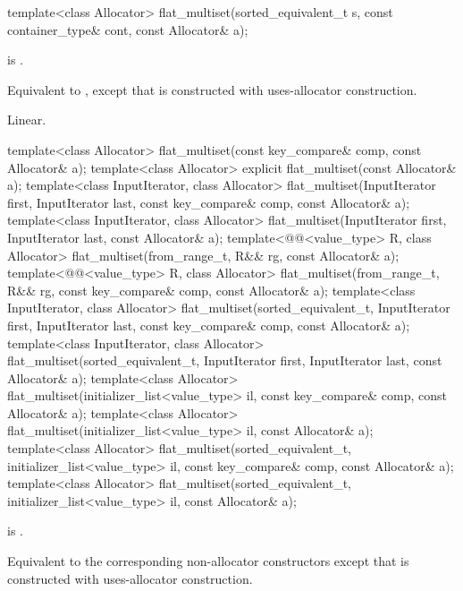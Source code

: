 %
\begin{itemdecl}
template<class Allocator>
  flat_multiset(sorted_equivalent_t s, const container_type& cont, const Allocator& a);
\end{itemdecl}

\begin{itemdescr}
\pnum
\constraints
{} is .

\pnum
\effects
Equivalent to ,
except that  is constructed with
uses-allocator construction.

\pnum
\complexity
Linear.
\end{itemdescr}

%
\begin{itemdecl}
template<class Allocator>
  flat_multiset(const key_compare& comp, const Allocator& a);
template<class Allocator>
  explicit flat_multiset(const Allocator& a);
template<class InputIterator, class Allocator>
  flat_multiset(InputIterator first, InputIterator last,
                const key_compare& comp, const Allocator& a);
template<class InputIterator, class Allocator>
  flat_multiset(InputIterator first, InputIterator last, const Allocator& a);
template<@@<value_type> R, class Allocator>
  flat_multiset(from_range_t, R&& rg, const Allocator& a);
template<@@<value_type> R, class Allocator>
  flat_multiset(from_range_t, R&& rg, const key_compare& comp, const Allocator& a);
template<class InputIterator, class Allocator>
  flat_multiset(sorted_equivalent_t, InputIterator first, InputIterator last,
                const key_compare& comp, const Allocator& a);
template<class InputIterator, class Allocator>
  flat_multiset(sorted_equivalent_t, InputIterator first, InputIterator last, const Allocator& a);
template<class Allocator>
  flat_multiset(initializer_list<value_type> il, const key_compare& comp, const Allocator& a);
template<class Allocator>
  flat_multiset(initializer_list<value_type> il, const Allocator& a);
template<class Allocator>
  flat_multiset(sorted_equivalent_t, initializer_list<value_type> il,
                const key_compare& comp, const Allocator& a);
template<class Allocator>
  flat_multiset(sorted_equivalent_t, initializer_list<value_type> il, const Allocator& a);
\end{itemdecl}

\begin{itemdescr}
\pnum
\constraints
{} is .

\pnum
\effects
Equivalent to the corresponding non-allocator constructors
except that  is constructed with
uses-allocator construction.
\end{itemdescr}

